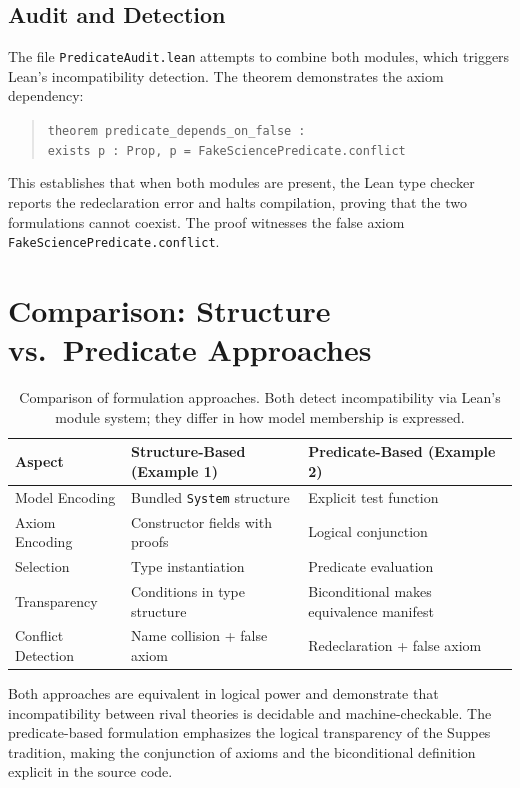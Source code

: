 \documentclass[11pt]{article}
\begin{document}
\subsection{Audit and Detection}

The file \texttt{PredicateAudit.lean} attempts to combine both modules, which
triggers Lean's incompatibility detection. The theorem demonstrates the axiom
dependency:

\begin{quote}
\texttt{theorem predicate\_depends\_on\_false :\\
    exists p : Prop, p = FakeSciencePredicate.conflict}
\end{quote}

This establishes that when both modules are present, the
Lean type checker reports the redeclaration error and halts compilation,
proving that the two formulations cannot coexist. The proof witnesses the
false axiom \texttt{FakeSciencePredicate.conflict}.

\section{Comparison: Structure vs.\ Predicate Approaches}

\begin{table}[ht]
\centering
\begin{tabular}{@{}lll@{}}
\toprule
Aspect & Structure-Based (Example 1) & Predicate-Based (Example 2) \\
\midrule
Model Encoding & Bundled \texttt{System} structure & Explicit test function \\
Axiom Encoding & Constructor fields with proofs & Logical conjunction \\
Selection & Type instantiation & Predicate evaluation \\
Transparency & Conditions in type structure & Biconditional makes equivalence manifest \\
Conflict Detection & Name collision + false axiom & Redeclaration + false axiom \\
\bottomrule
\end{tabular}
\caption{Comparison of formulation approaches. Both detect incompatibility
via Lean's module system; they differ in how model membership is expressed.}
\label{tab:comparison}
\end{table}

Both approaches are equivalent in logical power and demonstrate that
incompatibility between rival theories is decidable and machine-checkable.
The predicate-based formulation emphasizes the logical transparency of the
Suppes tradition, making the conjunction of axioms and the biconditional
definition explicit in the source code.
\end{document}
